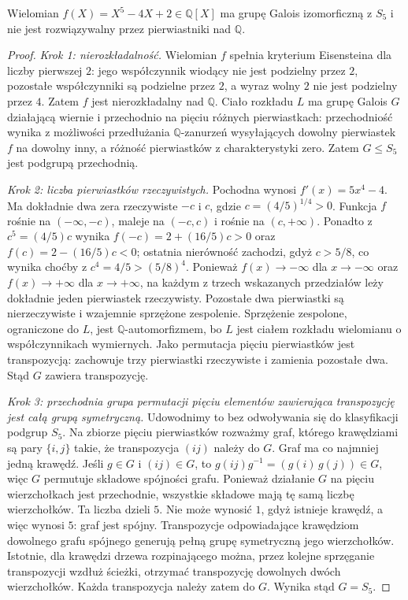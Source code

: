 \begin{twierdzenie}
\label{aa:tw:quintic-s5-example}
\label{aa:ex:quintic-unsolvable}
Wielomian $f(X)=X^5-4X+2\in\mathbb Q[X]$ ma
grupę Galois izomorficzną z $S_5$ i nie jest
rozwiązywalny przez pierwiastniki nad $\mathbb Q$.
\end{twierdzenie}
\begin{proof}
\emph{Krok 1: nierozkładalność.}
Wielomian $f$ spełnia kryterium Eisensteina
dla liczby pierwszej $2$: jego współczynnik
wiodący nie jest podzielny przez $2$,
pozostałe współczynniki są podzielne przez $2$,
a wyraz wolny $2$ nie jest podzielny przez $4$.
Zatem $f$ jest nierozkładalny nad $\mathbb Q$.
Ciało rozkładu $L$ ma grupę Galois $G$ działającą
wiernie i przechodnio na pięciu różnych pierwiastkach:
przechodniość wynika z możliwości przedłużania
$\mathbb Q$-zanurzeń wysyłających dowolny pierwiastek
$f$ na dowolny inny, a różność pierwiastków
z charakterystyki zero. Zatem $G\le S_5$ jest
podgrupą przechodnią.

\emph{Krok 2: liczba pierwiastków rzeczywistych.}
Pochodna wynosi $f'(x)=5x^4-4$.
Ma dokładnie dwa zera rzeczywiste $-c$ i $c$,
gdzie $c=(4/5)^{1/4}>0$.
Funkcja $f$ rośnie na $(-\infty,-c)$, maleje
na $(-c,c)$ i rośnie na $(c,+\infty)$.
Ponadto z $c^5=(4/5)c$ wynika
$f(-c)=2+(16/5)c>0$ oraz
$f(c)=2-(16/5)c<0$;
ostatnia nierówność zachodzi, gdyż $c>5/8$,
co wynika choćby z $c^4=4/5>(5/8)^4$.
Ponieważ $f(x)\to-\infty$ dla $x\to-\infty$
oraz $f(x)\to+\infty$ dla $x\to+\infty$,
na każdym z trzech wskazanych przedziałów
leży dokładnie jeden pierwiastek rzeczywisty.
Pozostałe dwa pierwiastki są nierzeczywiste
i wzajemnie sprzężone zespolenie.
Sprzężenie zespolone, ograniczone do $L$, jest
$\mathbb Q$-automorfizmem, bo $L$ jest ciałem
rozkładu wielomianu o współczynnikach wymiernych.
Jako permutacja pięciu pierwiastków jest transpozycją:
zachowuje trzy pierwiastki rzeczywiste i zamienia
pozostałe dwa. Stąd $G$ zawiera transpozycję.

\emph{Krok 3: przechodnia grupa permutacji pięciu elementów
zawierająca transpozycję jest całą grupą symetryczną.}
Udowodnimy to bez odwoływania się do klasyfikacji
podgrup $S_5$. Na zbiorze pięciu pierwiastków
rozważmy graf, którego krawędziami są pary
$\{i,j\}$ takie, że transpozycja $(ij)$ należy do $G$.
Graf ma co najmniej jedną krawędź. Jeśli
$g\in G$ i $(ij)\in G$, to
$g(ij)g^{-1}=(g(i)\,g(j))\in G$,
więc $G$ permutuje składowe spójności grafu.
Ponieważ działanie $G$ na pięciu wierzchołkach
jest przechodnie, wszystkie składowe mają tę samą
liczbę wierzchołków. Ta liczba dzieli $5$.
Nie może wynosić $1$, gdyż istnieje krawędź,
a więc wynosi $5$: graf jest spójny.
Transpozycje odpowiadające krawędziom dowolnego
grafu spójnego generują pełną grupę symetryczną
jego wierzchołków. Istotnie, dla krawędzi drzewa
rozpinającego można, przez kolejne sprzęganie
transpozycji wzdłuż ścieżki, otrzymać transpozycję
dowolnych dwóch wierzchołków. Każda transpozycja
należy zatem do $G$. Wynika stąd $G=S_5$.


\end{proof}
